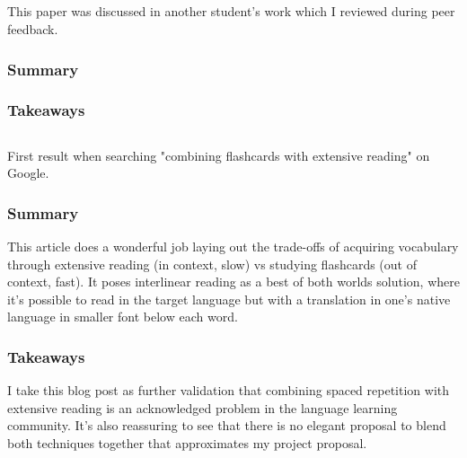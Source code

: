 \documentclass[
	letterpaper, %
]{jdf}
\begin{document}
\subsection{}
This paper was discussed in another student's work which I reviewed during peer feedback.

\subsubsection{Summary}


\subsubsection{Takeaways}


\subsection{}
First result when searching "combining flashcards with extensive reading" on Google.

\subsubsection{Summary}
This article does a wonderful job laying out the trade-offs of acquiring vocabulary through extensive reading (in context, slow) vs studying flashcards (out of context, fast). It poses interlinear reading as a best of both worlds solution, where it's possible to read in the target language but with a translation in one's native language in smaller font below each word.

\subsubsection{Takeaways}
I take this blog post as further validation that combining spaced repetition with extensive reading is an acknowledged problem in the language learning community. It's also reassuring to see that there is no elegant proposal to blend both techniques together that approximates my project proposal.
\end{document}
